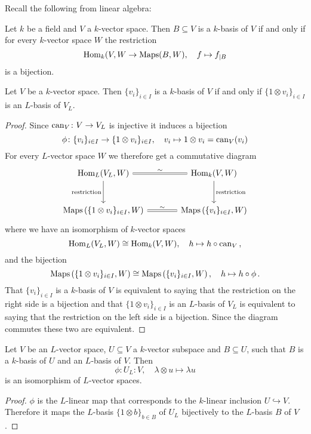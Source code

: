 Recall the following from linear algebra:


\begin{recall}
  Let $k$ be a field and $V$ a $k$-vector space.
  Then $B \subseteq V$ is a $k$-basis of $V$ if and only if for every $k$-vector space $W$ the restriction
  \[
        \operatorname{Hom}_k(V,W
    \to \operatorname{Maps}(B,W),
    \quad   f
    \mapsto f_{|B}
  \]
  is a bijection.
\end{recall}


\begin{lemma}
  Let $V$ be a $k$-vector space.
  Then $\{v_i\}_{i \in I}$ is a $k$-basis of $V$ if and only if $\{1 \otimes v_i\}_{i \in I}$ is an $L$-basis of $V_L$.
\end{lemma}
\begin{proof}
  Since $\operatorname{can}_V \colon V \to V_L$ is injective it induces a bijection
  \[
            \phi
    \colon  \{v_i\}_{i \in I}
    \to     \{1 \otimes v_i\}_{i \in I},
    \quad   v_i
    \mapsto 1 \otimes v_i
    =       \operatorname{can}_V(v_i)
  \]
  For every $L$-vector space $W$ we therefore get a commutative diagram
  \[
    \begin{tikzcd}[sep = large]
        \Hom_L(V_L, W)
        \arrow[equal]{r}{\sim}
        \arrow[swap]{d}{\text{restriction}}
      & \Hom_k(V,W)
        \arrow{d}{\text{restriction}}
      \\
        \Maps\left( \{1 \otimes v_i\}_{i \in I}, W \right)
        \arrow[equal]{r}{\sim}
      & \Maps\left( \{v_i\}_{i \in I}, W \right)
    \end{tikzcd}
  \]
  where we have an isomorphism of $k$-vector spaces
  \[
            \operatorname{Hom}_L(V_L, W)
    \cong   \operatorname{Hom}_k(V, W),
    \quad   h
    \mapsto h \circ \operatorname{can}_V \,,
  \]
  and the bijection
  \[
          \operatorname{Maps}\left( \{1 \otimes v_i\}_{i \in I}, W \right)
    \cong \operatorname{Maps}\left( \{v_i\}_{i \in I}, W \right),
    \quad   h
    \mapsto h \circ \phi \,.
  \]
  That $\{v_i\}_{i \in I}$ is a $k$-basis of $V$ is equivalent to saying that the restriction on the right side is a bijection and that $\{1 \otimes v_i\}_{i \in I}$ is an $L$-basis of $V_L$ is equivalent to saying that the restriction on the left side is a bijection.
  Since the diagram commutes these two are equivalent.
\end{proof}


\begin{corollary}\label{corollary: inclusion to bijection vector spaces}
  Let $V$ be an $L$-vector space, $U \subseteq V$ a $k$-vector subspace and $B \subseteq U$, such that $B$ is a $k$-basis of $U$ and an $L$-basis of $V$.
  Then
  \[
            \phi
    \colon  U_L
    \colon  V,
    \quad   \lambda \otimes u
    \mapsto \lambda u
  \]
  is an isomorphism of $L$-vector spaces.
\end{corollary}
\begin{proof}
  $\phi$ is the $L$-linear map that corresponds to the $k$-linear inclusion $U \hookrightarrow V$.
  Therefore it maps the $L$-basis $\{1 \otimes b\}_{b \in B}$ of $U_L$ bijectively to the $L$-basis $B$ of $V$.
\end{proof}


